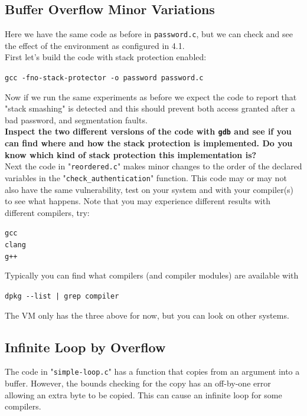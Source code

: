 \documentclass{article}
\begin{document}
\subsection{Buffer Overflow Minor Variations}
Here we have the same code as before in \lstinline{password.c}, but we can check and see the effect of the environment as configured in 4.1.\\

\noindent First let's build the code with stack protection enabled:
\begin{center}
    \lstinline{gcc -fno-stack-protector -o password password.c}
\end{center}
\noindent Now if we run the same experiments as before we expect the code to
report that "stack smashing" is detected and this should prevent both access
granted after a bad password, and segmentation faults.\\


\noindent \textbf{Inspect the two different versions of the code with \lstinline{gdb} and see if you can find where and how the stack protection is implemented. Do
you know which kind of stack protection this implementation is?}\\


\noindent Next the code in "\lstinline{reordered.c}" makes minor changes to the order of the
declared variables in the "\lstinline{check_authentication}" function. This code may or
may not also have the same vulnerability, test on your system and with your
compiler(s) to see what happens. Note that you may experience different
results with different compilers, try:
\begin{center}
    \lstinline{gcc}\\
    \lstinline{clang}\\
    \lstinline{g++}
\end{center}
\noindent Typically you can find what compilers (and compiler modules) are available
with
\begin{center}
    \lstinline{dpkg --list | grep compiler}
\end{center}
\noindent The VM only has the three above for now, but you can look on other systems.

\subsection{Infinite Loop by Overflow}
The code in "\lstinline{simple-loop.c}" has a function that copies from an argument into a buffer. However, the bounds checking for the copy has an off-by-one error allowing an extra byte to be copied. This can cause an infinite loop for some compilers. \\
\end{document}
